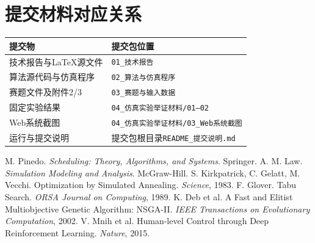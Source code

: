 \documentclass[UTF8,zihao=-4,openany]{ctexrep}
\newcommand{\code}[1]{\texttt{#1}}
\begin{document}
\chapter{提交材料对应关系}

\begin{table}[H]
\centering
\begin{tabularx}{\textwidth}{p{}Y}
\toprule
提交物 & 提交包位置 \\
\midrule
技术报告与LaTeX源文件 & \code{01\_技术报告} \\
算法源代码与仿真程序 & \code{02\_算法与仿真程序} \\
赛题文件及附件2/3 & \code{03\_赛题与输入数据} \\
固定实验结果 & \code{04\_仿真实验举证材料/01--02} \\
Web系统截图 & \code{04\_仿真实验举证材料/03\_Web系统截图} \\
运行与提交说明 & 提交包根目录\code{README\_提交说明.md} \\
\bottomrule
\end{tabularx}
\end{table}

\begin{thebibliography}{9}
 M. Pinedo. \textit{Scheduling: Theory, Algorithms, and Systems}. Springer.
 A. M. Law. \textit{Simulation Modeling and Analysis}. McGraw-Hill.
 S. Kirkpatrick, C. Gelatt, M. Vecchi. Optimization by Simulated Annealing. \textit{Science}, 1983.
 F. Glover. Tabu Search. \textit{ORSA Journal on Computing}, 1989.
 K. Deb et al. A Fast and Elitist Multiobjective Genetic Algorithm: NSGA-II. \textit{IEEE Transactions on Evolutionary Computation}, 2002.
 V. Mnih et al. Human-level Control through Deep Reinforcement Learning. \textit{Nature}, 2015.
\end{thebibliography}
\end{document}

